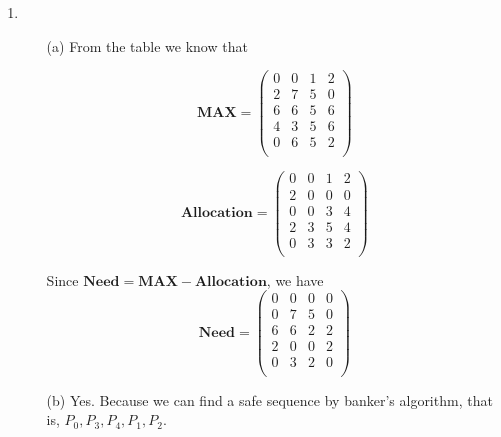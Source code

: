 \documentclass[12pt,a4paper]{article}
\begin{document}
\begin{enumerate}
		\item
			\begin{itemize}
				\item[(a)]  From the table we know that\\
				\begin{minipage}{0.45\textwidth}
					\centering
					\begin{displaymath}
					\mathbf{MAX} =
					\left( \begin{array}{cccc}
					0 & 0 & 1 & 2 \\
					2 & 7 & 5 & 0 \\
					6 & 6 & 5 & 6 \\
					4 & 3 & 5 & 6 \\
					0 & 6 & 5 & 2 \\
					\end{array} \right)
					\end{displaymath}
				\end{minipage}
				\hspace{5mm}
				\begin{minipage}{0.45\textwidth}
					\centering
					\begin{displaymath}
					\mathbf{Allocation} =
					\left( \begin{array}{cccc}
					0 & 0 & 1 & 2 \\
					2 & 0 & 0 & 0 \\
					0 & 0 & 3 & 4 \\
					2 & 3 & 5 & 4 \\
					0 & 3 & 3 & 2 \\
					\end{array} \right)
					\end{displaymath}
				\end{minipage}
			Since $\mathbf{Need} = \mathbf{MAX} - \mathbf{Allocation}$, we have 
			\begin{displaymath}
			\mathbf{Need} =
			\left( \begin{array}{cccc}
			0 & 0 & 0 & 0 \\
			0 & 7 & 5 & 0 \\
			6 & 6 & 2 & 2 \\
			2 & 0 & 0 & 2 \\
			0 & 3 & 2 & 0 \\
			\end{array} \right)
			\end{displaymath}
			
			\item[(b)] Yes. Because we can find a safe sequence by banker's algorithm, that is, $P_0, P_3, P_4, P_1, P_2$.
			

\end{itemize}
\end{enumerate}
\end{document}
